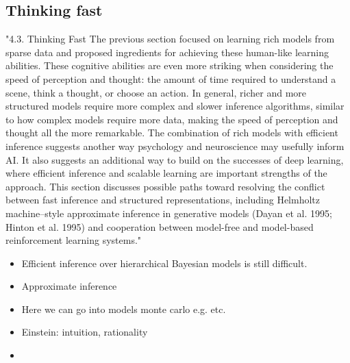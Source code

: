 \subsection{Thinking fast}
\cite{Lake_Ullman_Tenenbaum_Gershman_2017}
"4.3. Thinking Fast The previous section focused on learning rich models from sparse data and proposed ingredients for achieving these human-like learning abilities. These cognitive abilities are even more striking when considering the speed of perception and thought: the amount of time required to understand a scene, think a thought, or choose an action. In general, richer and more structured models require more complex and slower inference algorithms, similar to how complex models require more data, making the speed of perception and thought all the more remarkable. The combination of rich models with efficient inference suggests another way psychology and neuroscience may usefully inform AI. It also suggests an additional way to build on the successes of deep learning, where efficient inference and scalable learning are important strengths of the approach. This section discusses possible paths toward resolving the conflict between fast inference and structured representations, including Helmholtz machine–style approximate inference in generative models (Dayan et al. 1995; Hinton et al. 1995) and cooperation between model-free and model-based reinforcement learning systems."


\begin{itemize}
    \item Efficient inference over hierarchical Bayesian models is still difficult.
    \item Approximate inference
    \item Here we can go into models monte carlo e.g. etc.
    \item Einstein: intuition, rationality
    \item 
\end{itemize}


